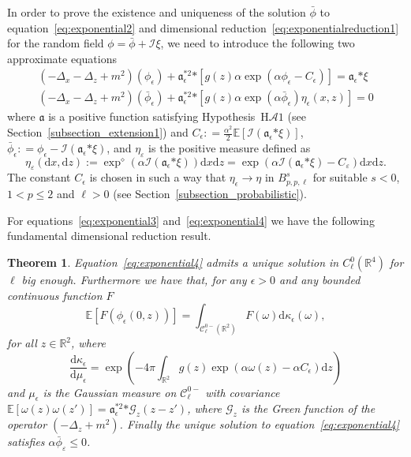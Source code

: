 \documentclass[a4paper,10pt]{article}
\newcommand{\assign}{:=}
\newcommand{\asterisk}{\mathord{*}}
\newcommand{\mathd}{\mathrm{d}}
\newtheorem{theorem}{Theorem}
\begin{document}
In order to prove the existence and uniqueness of the solution $\bar{\phi}$ to
equation~{\eqref{eq:exponential2}} and dimensional
reduction~{\eqref{eq:exponentialreduction1}} for the random field $\phi =
\bar{\phi} + \mathcal{I} \xi$, we need to introduce the following two
approximate equations
\begin{eqnarray}
  & (- \Delta_x - \Delta_z + m^2) (\phi_{\epsilon}) +
  \mathfrak{a}_{\epsilon}^{\asterisk 2} \asterisk [g (z) \alpha \exp (\alpha
  \phi_{\epsilon} - C_{\epsilon})] = \mathfrak{a}_{\epsilon} \asterisk \xi & 
  \label{eq:exponential3}\\
  & (- \Delta_x - \Delta_z + m^2) (\bar{\phi}_{\epsilon}) +
  \mathfrak{a}_{\epsilon}^{\asterisk 2} \asterisk [g (z) \alpha \exp (\alpha
  \bar{\phi}_{\epsilon}) \eta_{\epsilon} (x, z)] = 0 & 
  \label{eq:exponential4}
\end{eqnarray}
where $\mathfrak{a}$ is a positive function satisfying
Hypothesis~H$\mathcal{A} 1$ (see Section~\ref{subsection_extension1}) and
$C_{\epsilon} : = \frac{\alpha^2}{2} \mathbb{E} [\mathcal{I}
(\mathfrak{a}_{\epsilon} \asterisk \xi)]$, $\bar{\phi}_{\epsilon} : =
\phi_{\epsilon} - \mathcal{I} (\mathfrak{a}_{\epsilon} \asterisk \xi)$, and
$\eta_{\varepsilon}$ is the positive measure defined as
\[ \eta_{\varepsilon} (\mathd x, \mathd z) \assign \exp^{\diamond} (\alpha
   \mathcal{I} (\mathfrak{a}_{\epsilon} \asterisk \xi)) \mathd x \mathd z =
   \exp (\alpha \mathcal{I} (\mathfrak{a}_{\epsilon} \asterisk \xi) -
   C_{\varepsilon}) \mathd x \mathd z. \]
The constant $C_{\epsilon}$ is chosen in such a way that $\eta_{\epsilon}
\rightarrow \eta$ in $B^s_{p, p, \ell}$ for suitable $s < 0$, $1 < p \leqslant
2$ and $\ell > 0$ (see Section~\ref{subsection_probabilistic}).

For equations~{\eqref{eq:exponential3}} and~{\eqref{eq:exponential4}} we have
the following fundamental dimensional reduction result.

\begin{theorem}
  \label{theorem_regularexponential}Equation~{\eqref{eq:exponential4}} admits
  a unique solution in $C^0_{\ell} (\mathbb{R}^4)$ for $\ell$ big enough.
  Furthermore we have that, for any $\epsilon > 0$ and any bounded continuous
  function $F$
  \begin{equation}
    \mathbb{E} [F (\phi_{\epsilon} (0, z))] = \int_{\mathcal{C}^{0 -}_{\ell}
    (\mathbb{R}^2)} F (\omega) \mathd \kappa_{\epsilon} (\omega)
    \label{eq:exponential5},
  \end{equation}
  for all $z \in \mathbb{R}^2$, where
  \[ \frac{\mathd \kappa_{\epsilon}}{\mathd \mu_{\epsilon}} = \exp \left( - 4
     \pi \int_{\mathbb{R}^2} g (z) \exp (\alpha \omega (z) - \alpha
     C_{\epsilon}) \mathd z \right) \]
  and $\mu_{\epsilon}$ is the Gaussian measure on $\mathcal{C}^{0 -}_{\ell}$
  with covariance $\mathbb{E} [\omega (z) \omega (z')] =
  \mathfrak{a}^{\asterisk 2}_{\epsilon} \asterisk \mathcal{G}_z (z - z')$,
  where $\mathcal{G}_z$ is the Green function of the operator $(- \Delta_z +
  m^2)$. Finally the unique solution to equation~{\eqref{eq:exponential4}}
  satisfies $\alpha \bar{\phi}_{\varepsilon} \leqslant 0$.
\end{theorem}
\end{document}
